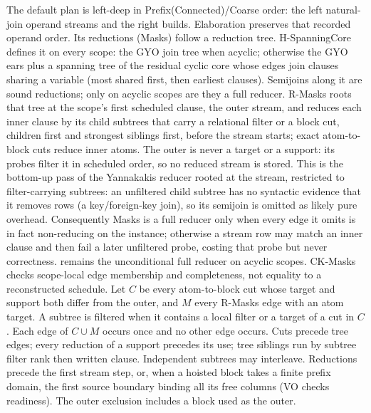 The default plan is left-deep in Prefix(Connected)/Coarse order: the left
natural-join operand streams and the right builds. Elaboration preserves that
recorded operand order. Its reductions
(Masks) follow a reduction tree. H-SpanningCore defines it on every scope: the
GYO join tree when acyclic; otherwise the GYO ears plus a spanning tree of the
residual cyclic core whose edges join clauses sharing a variable (most shared
first, then earliest clauses). Semijoins along it are sound reductions; only on
acyclic scopes are they a full reducer. R-Masks roots that tree at the scope's
first scheduled clause, the outer stream, and reduces each inner clause by its
child subtrees that carry a relational filter or a block cut, children first and
strongest siblings first, before the stream starts; exact atom-to-block cuts
reduce inner atoms. The outer is never a target or a support: its probes filter
it in scheduled order, so no reduced stream is stored. This is the bottom-up pass
of the Yannakakis reducer rooted at the stream, restricted to filter-carrying
subtrees: an unfiltered child subtree has no syntactic evidence that it removes
rows (a key/foreign-key join), so its semijoin is omitted as likely pure
overhead. Consequently Masks is a full reducer only when every edge it omits is
in fact non-reducing on the instance; otherwise a stream row may match an inner
clause and then fail a later unfiltered probe, costing that probe but never
correctness.  remains the unconditional full reducer on acyclic
scopes. CK-Masks checks scope-local edge membership and completeness, not
equality to a reconstructed schedule. Let $C$ be every atom-to-block cut
whose target and support both differ from the outer, and $M$ every
R-Masks edge with an atom target. A subtree is filtered when it contains a
local filter or a target of a cut in $C$. Each edge of $C\cup M$ occurs once
and no other edge occurs. Cuts precede tree edges; every reduction of a
support precedes its use; tree siblings run by subtree filter rank then
written clause. Independent subtrees may interleave. Reductions precede the
first stream step, or, when a hoisted block takes a finite prefix domain,
the first source boundary binding all its free columns (VO checks
readiness). The outer exclusion includes a block used as the outer.
